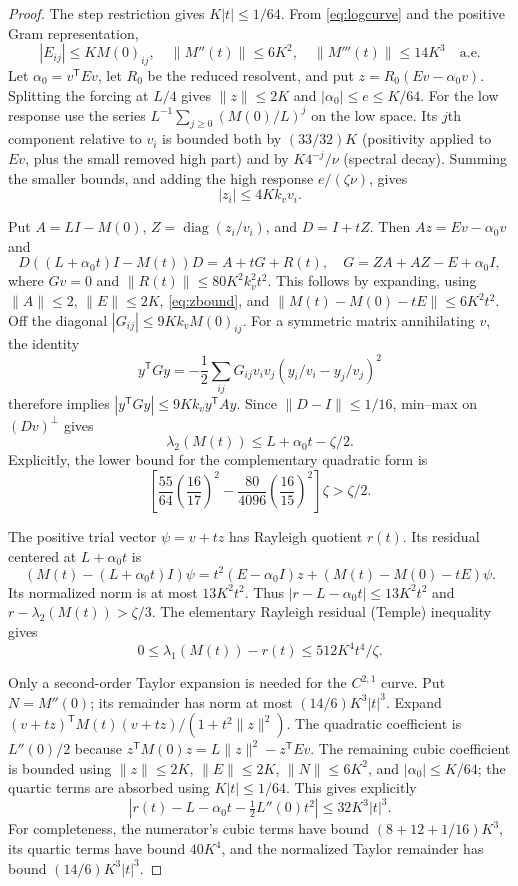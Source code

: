 \documentclass[11pt]{amsart}
\theoremstyle{remark}\newtheorem{remark}[theorem]{Remark}
\newcommand{\diag}{\operatorname{diag}}
\newcommand{\T}{\mathsf T}
\begin{document}
\begin{proof}
The step restriction gives $K|t|\le1/64$. From \eqref{eq:logcurve} and the
positive Gram representation,
\[
 |E_{ij}|\le KM(0)_{ij},\quad \|M''(t)\|\le6K^2,\quad
 \|M'''(t)\|\le14K^3\quad\text{a.e.}
\]
Let $\alpha_0=v^\T Ev$, let $R_0$ be the reduced resolvent, and put
$z=R_0(Ev-\alpha_0v)$.
Splitting the forcing at $L/4$ gives $\|z\|\le2K$ and
$|\alpha_0|\le e\le K/64$.
For the low response use the series
$L^{-1}\sum_{j\ge0}(M(0)/L)^j$ on the low space.
Its $j$th component relative to $v_i$ is bounded both by $(33/32)K$
(positivity applied to $Ev$, plus the small removed high part) and by
$K4^{-j}/\nu$ (spectral decay). Summing the smaller bounds, and adding
the high response $e/(\zeta\nu)$, gives
\begin{equation}\label{eq:zbound}
 |z_i|\le4Kk_vv_i.
\end{equation}

Put $A=LI-M(0)$, $Z=\diag(z_i/v_i)$, and $D=I+tZ$.
Then $Az=Ev-\alpha_0v$ and
\[
 D((L+\alpha_0t)I-M(t))D=A+tG+R(t),\quad
 G=ZA+AZ-E+\alpha_0I,
\]
where $Gv=0$ and $\|R(t)\|\le80K^2k_v^2t^2$.
This follows by expanding, using $\|A\|\le2$,
$\|E\|\le2K$, \eqref{eq:zbound}, and
$\|M(t)-M(0)-tE\|\le6K^2t^2$.
Off the diagonal $|G_{ij}|\le9Kk_vM(0)_{ij}$.
For a symmetric matrix annihilating $v$, the identity
\[
 y^\T Gy=-\frac12\sum_{ij}G_{ij}v_iv_j
                         (y_i/v_i-y_j/v_j)^2
\]
therefore implies $|y^\T Gy|\le9Kk_v y^\T Ay$.
Since $\|D-I\|\le1/16$, min--max on $(Dv)^\perp$ gives
\[
 \lambda_2(M(t))\le L+\alpha_0t-\zeta/2.
\]
Explicitly, the lower bound for the complementary quadratic form is
\[
 \left[\frac{55}{64}\left(\frac{16}{17}\right)^2
 -\frac{80}{4096}\left(\frac{16}{15}\right)^2\right]\zeta
 >\zeta/2.
\]

The positive trial vector $\psi=v+tz$ has Rayleigh quotient $r(t)$.
Its residual centered at $L+\alpha_0t$ is
\[
 (M(t)-(L+\alpha_0t)I)\psi
 =t^2(E-\alpha_0I)z+(M(t)-M(0)-tE)\psi.
\]
Its normalized norm is at most $13K^2t^2$.
Thus $|r-L-\alpha_0t|\le13K^2t^2$ and
$r-\lambda_2(M(t))>\zeta/3$.
The elementary Rayleigh residual (Temple) inequality gives
\begin{equation}\label{eq:temple}
 0\le\lambda_1(M(t))-r(t)\le512K^4t^4/\zeta.
\end{equation}

Only a second-order Taylor expansion is needed for the $C^{2,1}$ curve.
Put $N=M''(0)$; its remainder has norm at most
$(14/6)K^3|t|^3$. Expand
$(v+tz)^\T M(t)(v+tz)/(1+t^2\|z\|^2)$.
The quadratic coefficient is $L''(0)/2$ because
$z^\T M(0)z=L\|z\|^2-z^\T Ev$.
The remaining cubic coefficient is bounded using
$\|z\|\le2K$, $\|E\|\le2K$, $\|N\|\le6K^2$,
and $|\alpha_0|\le K/64$; the quartic terms are absorbed using
$K|t|\le1/64$. This gives explicitly
\[
 \left|r(t)-L-\alpha_0t-\tfrac12L''(0)t^2\right|
 \le32K^3|t|^3.
\]
For completeness, the numerator's cubic terms have bound
$(8+12+1/16)K^3$, its quartic terms have bound $40K^4$, and the
normalized Taylor remainder has bound $(14/6)K^3|t|^3$.


\end{proof}
\end{document}
